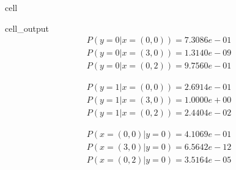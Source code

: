 \documentclass[letterpaper,10pt,english]{jupyterBook}
\begin{document}
\begin{sphinxuseclass}{cell}
\begin{sphinxVerbatimOutput}
\begin{sphinxuseclass}{cell_output}\begin{equation*}
\begin{split}\displaystyle P(y=0|x=(0, 0)) = 7.3086e-01\end{split}
\end{equation*}\begin{equation*}
\begin{split}\displaystyle P(y=0|x=(3, 0)) = 1.3140e-09\end{split}
\end{equation*}\begin{equation*}
\begin{split}\displaystyle P(y=0|x=(0, 2)) = 9.7560e-01\end{split}
\end{equation*}
\begin{sphinxVerbatim}[commandchars=\\\{\}]

\end{sphinxVerbatim}
\begin{equation*}
\begin{split}\displaystyle P(y=1|x=(0, 0)) = 2.6914e-01\end{split}
\end{equation*}\begin{equation*}
\begin{split}\displaystyle P(y=1|x=(3, 0)) = 1.0000e+00\end{split}
\end{equation*}\begin{equation*}
\begin{split}\displaystyle P(y=1|x=(0, 2)) = 2.4404e-02\end{split}
\end{equation*}
\begin{sphinxVerbatim}[commandchars=\\\{\}]

\end{sphinxVerbatim}
\begin{equation*}
\begin{split}\displaystyle P(x=(0, 0)|y=0) = 4.1069e-01\end{split}
\end{equation*}\begin{equation*}
\begin{split}\displaystyle P(x=(3, 0)|y=0) = 6.5642e-12\end{split}
\end{equation*}\begin{equation*}
\begin{split}\displaystyle P(x=(0, 2)|y=0) = 3.5164e-05\end{split}
\end{equation*}
\begin{sphinxVerbatim}[commandchars=\\\{\}]


\end{sphinxVerbatim}
\end{sphinxuseclass}
\end{sphinxVerbatimOutput}
\end{sphinxuseclass}
\end{document}

